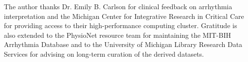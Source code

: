The author thanks Dr. Emily B. Carlson for clinical feedback on arrhythmia interpretation and the Michigan Center for Integrative Research in Critical Care for providing access to their high-performance computing cluster. Gratitude is also extended to the PhysioNet resource team for maintaining the MIT-BIH Arrhythmia Database and to the University of Michigan Library Research Data Services for advising on long-term curation of the derived datasets.
